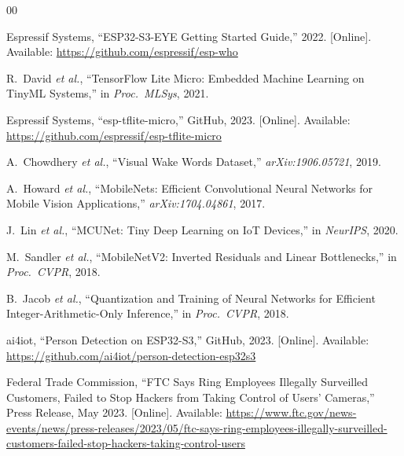 \documentclass[conference]{IEEEtran}
\begin{document}
\begin{thebibliography}{00}

Espressif Systems, ``ESP32-S3-EYE Getting Started Guide,'' 2022.
[Online]. Available: \url{https://github.com/espressif/esp-who}

R.~David \textit{et al.}, ``TensorFlow Lite Micro: Embedded Machine
Learning on TinyML Systems,'' in \textit{Proc.\ MLSys}, 2021.

Espressif Systems, ``esp-tflite-micro,'' GitHub, 2023.
[Online]. Available: \url{https://github.com/espressif/esp-tflite-micro}

A.~Chowdhery \textit{et al.}, ``Visual Wake Words Dataset,''
\textit{arXiv:1906.05721}, 2019.

A.~Howard \textit{et al.}, ``MobileNets: Efficient Convolutional Neural
Networks for Mobile Vision Applications,'' \textit{arXiv:1704.04861}, 2017.

J.~Lin \textit{et al.}, ``MCUNet: Tiny Deep Learning on IoT Devices,''
in \textit{NeurIPS}, 2020.

M.~Sandler \textit{et al.}, ``MobileNetV2: Inverted Residuals and Linear
Bottlenecks,'' in \textit{Proc.\ CVPR}, 2018.

B.~Jacob \textit{et al.}, ``Quantization and Training of Neural Networks
for Efficient Integer-Arithmetic-Only Inference,'' in \textit{Proc.\ CVPR},
2018.

ai4iot, ``Person Detection on ESP32-S3,'' GitHub, 2023.
[Online]. Available: \url{https://github.com/ai4iot/person-detection-esp32s3}

Federal Trade Commission, ``FTC Says Ring Employees Illegally Surveilled Customers, Failed to Stop Hackers from Taking Control of Users' Cameras,'' Press Release, May 2023. [Online]. Available: \url{https://www.ftc.gov/news-events/news/press-releases/2023/05/ftc-says-ring-employees-illegally-surveilled-customers-failed-stop-hackers-taking-control-users}

\end{thebibliography}
\end{document}
